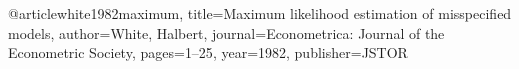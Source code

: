 @article{white1982maximum,
  title={Maximum likelihood estimation of misspecified models},
  author={White, Halbert},
  journal={Econometrica: Journal of the Econometric Society},
  pages={1--25},
  year={1982},
  publisher={JSTOR}
}
